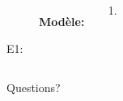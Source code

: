 \documentclass{beamer}
\begin{document}
  \begin{frame}{}
     \\
    \tinygloss{}
    \begin{columns}
        \begin{description}
          \item[] \textbf{Modèle:}
          \item[] 
          \item[E1:]
        \end{description}
        \begin{enumerate}
          \item
        \end{enumerate}
    \end{columns}
  \end{frame}

  \begin{frame}{}
    \begin{center}
      \Large Questions?
    \end{center}
  \end{frame}
\end{document}
